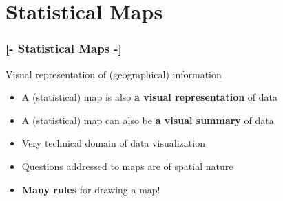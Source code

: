 \documentclass[xcolor=x11names,aspectratio=169, compress]{beamer}
\renewcommand{\(}{\begin{columns}}
\renewcommand{\)}{\end{columns}}
\newcommand{\<}[1]{\begin{column}{#1}}
\renewcommand{\>}{\end{column}}
\begin{document}
\begin{frame}
\begin{center}
\begin{itemize}
\end{itemize}
\end{center}
\end{frame}

\section{Statistical Maps}

\begin{frame} %
\frametitle{\textcolor{brique}{[-  \textbf{Statistical Maps} -]}}
Visual representation of (geographical) information
\begin{itemize}[<+-|alert@+>]
    \item A (statistical) map is also \textbf{a visual representation}  of data
    \item A (statistical) map  can also be \textbf{a visual summary} of data
    \item Very technical domain of data visualization
    \item Questions addressed to maps are of spatial nature
    \item  \textbf{Many rules} for drawing a map!
\end{itemize}
\end{frame}
\end{document}
